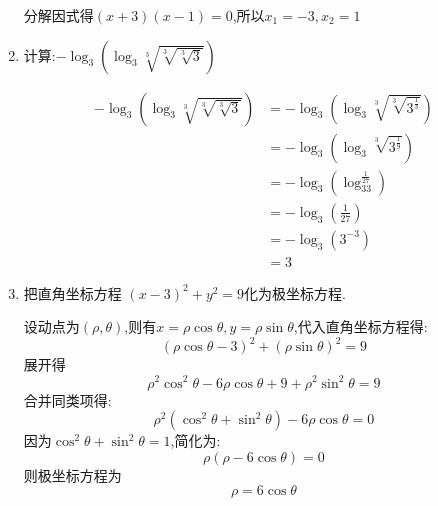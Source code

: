 \begin{questions}
\begin{enumerate}[label=(\arabic*)]
\begin{solution}
			      分解因式得$(x+3)(x-1) = 0$,所以$x_1 = -3, x_2 = 1$
		      \end{solution}
		\item 计算:$-\log_3(\log_3\sqrt[3]{\sqrt[3]{\sqrt[3]{3}}})$
		      \begin{solution}
			      \begin{align*}
				      -\log_3(\log_3\sqrt[3]{\sqrt[3]{\sqrt[3]{3}}}) & = -\log_3(\log_3\sqrt[3]{\sqrt[3]{3^\frac13}}) \\
				                                                     & = -\log_3(\log_3\sqrt[3]{3^\frac19})           \\
				                                                     & = -\log_3(\log_33^\frac1{27})                  \\
				                                                     & = -\log_3\left(\frac{1}{27}\right)             \\
				                                                     & = -\log_3\left(3^{-3}\right)                   \\
				                                                     & = 3
			      \end{align*}
		      \end{solution}
		\item 把直角坐标方程 \( (x-3)^2 + y^2 = 9 \)化为极坐标方程.
		      \begin{solution}
			      设动点为$(\rho, \theta)$,则有$x=\rho\cos\theta, y=\rho\sin\theta$,代入直角坐标方程得:
			      \begin{equation*}
				      (\rho\cos\theta - 3)^2 + (\rho\sin\theta)^2 = 9
			      \end{equation*}
			      展开得
			      \begin{equation*}
				      \rho^2\cos^2\theta - 6\rho\cos\theta + 9 + \rho^2\sin^2\theta = 9
			      \end{equation*}
			      合并同类项得:
			      \begin{equation*}
				      \rho^2(\cos^2\theta + \sin^2\theta) - 6\rho\cos\theta = 0
			      \end{equation*}
			      因为$\cos^2\theta + \sin^2\theta = 1$,简化为:
			      \begin{equation*}
				      \rho(\rho - 6\cos\theta) = 0
			      \end{equation*}
			      则极坐标方程为
			      \begin{equation*}
				      \rho = 6\cos\theta
			      \end{equation*}
		      \end{solution}

\end{enumerate}
\end{questions}
